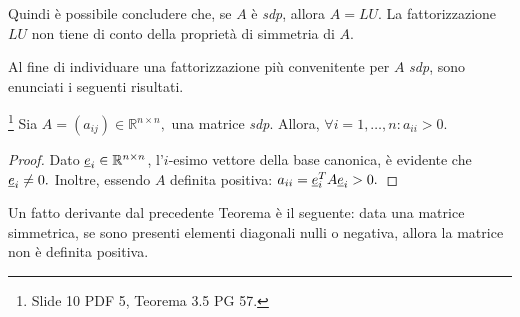 Quindi è possibile concludere che, se $A$ è \textit{sdp}, allora $A=LU$. La fattorizzazione $LU$ non tiene di conto della proprietà di simmetria di $A$.

Al fine di individuare una fattorizzazione più convenitente per $A$ \textit{sdp}, sono enunciati i seguenti risultati.

\begin{theorem}\label{th:elDiagPosMatrSDP}\footnote{Slide 10 PDF 5, Teorema 3.5 PG 57.}
    Sia $A=(a_{ij})\in\mathbb R^{n\times n},$ una matrice \textit{sdp}. Allora, $\forall i=1,\hdots,n: a_{ii}>0.$
\end{theorem}
\begin{proof}
    Dato $\uline e_i\in\mathbb R^{n\times n}$, l'$i$-esimo vettore della base canonica, è evidente che $\uline e_i\neq 0.$ Inoltre, essendo $A$ definita positiva: $a_{ii}=\uline e_i^T A \uline e_i>0.$
\end{proof}

Un fatto derivante dal precedente Teorema è il seguente: data una matrice simmetrica, se sono presenti elementi diagonali nulli o negativa, allora la matrice non è definita positiva. 

